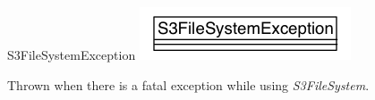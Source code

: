 \begin{XeClass}{S3FileSystemException}
\includegraphics[width=\textwidth]{cdig/S3FileSystemException.png}
     
 Thrown when there is a fatal exception while using \emph{S3FileSystem}.

\end{XeClass}
